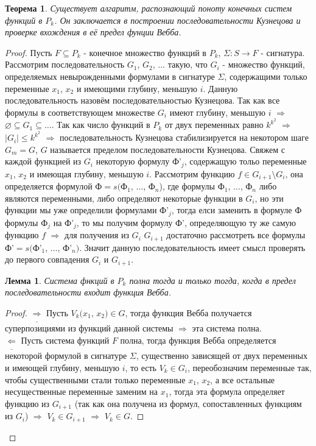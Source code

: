 \documentclass[a4paper, 12pt]{article}
\theoremstyle{definition}
\theoremstyle{plain}
\newtheorem*{theorem}{Теорема}
\newtheorem*{lemma}{Лемма}
\theoremstyle{remark}
\begin{document}
  \begin{theorem}
    Существует алгаритм, распознающий поноту конечных систем функций в $P_k$. Он заключается в построении последовательности Кузнецова и проверке вхождения в её предел фунции Вебба.
  \end{theorem}
  \begin{proof}
    Пусть $F\subseteq P_k$ - конечное множество функций в $P_k$, $\Sigma:S\to F$ - сигнатура. Рассмотрим последовательность $G_1$, $G_2$, $\ldots$ такую, что $G_i$ - множество функций, определяемых невырожденными формулами в сигнатуре $\Sigma$, содержащими только переменные $x_1$, $x_2$ и имеющими глубину, меньшую $i$. Данную последовательность назовём последовательностью Кузнецова. Так как все формулы в соответствующем множестве $G_i$ имеют глубину, меньшую $i$ $\Longrightarrow$ $\varnothing\subseteq G_1\subseteq\ldots$. Так как число функций в $P_k$ от двух переменных равно $k^{k^2}$ $\Longrightarrow$ $|G_i|\leqslant k^{k^2}$ $\Longrightarrow$ последовательность Кузнецова стабилизируется на некотором шаге $G_m=G$, $G$ называется пределом последовательности Кузнецова. Свяжем с каждой функцией из $G_i$ некоторую формулу Ф'$_j$, содержащую тольо переменные $x_1$, $x_2$ и имеющая глубину, меньшую $i$. Рассмотрим функцию $f\in G_{i+1}\setminus G_i$, она определяется формулой Ф$=s($Ф$_1$, $\ldots$, Ф$_n$), где формулы Ф$_1$, $\ldots$, Ф$_n$ либо являются переменными, либо определяют некоторые функции в $G_i$, но эти функции мы уже определили формулами Ф'$_j$, тогда елси заменить в формуле Ф формулы Ф$_j$ на Ф'$_j$, то мы получим формулу Ф', определяющую ту же самую функцию $f$ $\Longrightarrow$ для получения из $G_i$ $G_{i+1}$ достаточно рассмотреть все формулы Ф'$=s($Ф'$_1$, $\ldots$, Ф'$_n)$. Значит данную последовательность имеет смысл проверять до первого совпадения $G_i$ и $G_{i+1}$.\\
    \begin{lemma}
      Система фнкций в $P_k$ полна тогда и только тогда, когда в предел последовательности входит функция Вебба.
    \end{lemma}
    \begin{proof}
      $\underline{\Longrightarrow}$ Пусть $V_k(x_1$, $x_2)\in G$, тогда функция Вебба получается суперпозициями из функций данной системы $\Longrightarrow$ эта система полна.\\
      $\underline{\Longleftarrow}$ Пусть система функций $F$ полна, тогда функция Вебба определяется некоторой формулой в сигнатуре $\Sigma$, существенно зависящей от двух переменных и имеющей глубину, меньшую $i$, то есть $V_k\in G_i$, переобозначим переменные так, чтобы существенными стали только переменные $x_1$, $x_2$, а все остальные несущественные переменные заменим на $x_1$, тогда эта формула определяет функцию из $G_{i+1}$ (так как она получена из формул, сопоставленных функциям из $G_i$) $\Longrightarrow$ $V_k\in G_{i+1}$ $\Longrightarrow$ $V_k\in G$.
    \end{proof}
  \end{proof}
\end{document}

